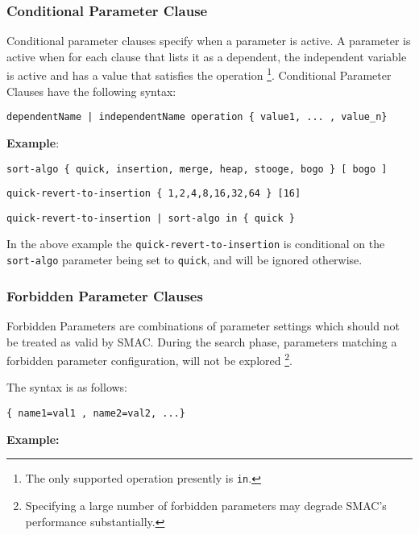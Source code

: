 \documentclass[manual.tex]{subfiles}
\begin{document}
\subsubsection{Conditional Parameter Clause}

Conditional parameter clauses specify when a parameter is active. A parameter
is active when for each clause that lists it as a dependent, the independent variable is active and has a value that satisfies the operation \footnote{The only supported operation presently is \texttt{in}.}. Conditional Parameter Clauses have the following syntax:


\texttt{dependentName~|~independentName~operation~\{~value1,~...~,~value\_n\}}

\vspace{2pt}
\textbf{Example}:
\vspace{5pt}

\texttt{sort-algo~\{~quick,~insertion,~merge,~heap,~stooge,~bogo~\}~{[}~bogo~{]}}

\texttt{quick-revert-to-insertion~\{~1,2,4,8,16,32,64~\}~{[}16{]}}

\texttt{quick-revert-to-insertion~|~sort-algo~in~\{~quick~\}}
\vspace{2pt}

In the above example the \texttt{quick-revert-to-insertion} is conditional on the \texttt{sort-algo} parameter being set to \texttt{quick}, and will be ignored otherwise.


\subsubsection{Forbidden Parameter Clauses}

Forbidden Parameters are combinations of parameter settings which should not be treated
as valid by SMAC. During the search phase, parameters matching a forbidden
parameter configuration, will not be explored \footnote{Specifying a large number of forbidden parameters may degrade SMAC's performance substantially.}. 

The syntax is as follows:

\texttt{\{~name1=val1~,~name2=val2,~...\}}

\vspace{2pt}
\textbf{Example:}
\vspace{5pt}
\end{document}
